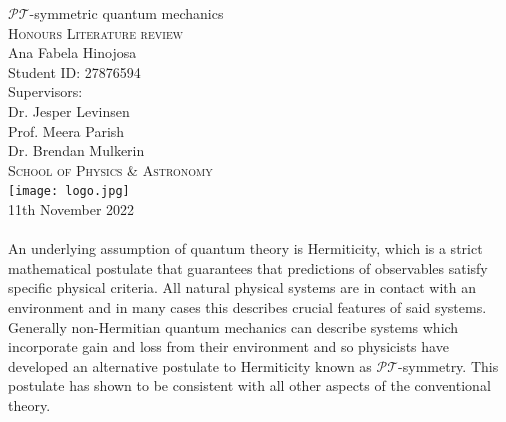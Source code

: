 \documentclass[12pt, a4paper]{report}
\newcommand\PT{\(\mathcal{PT}\)}
\begin{document}
  \begin{center}
  \vspace{2cm}
  {\Huge \( \mathcal{PT} \)-symmetric quantum mechanics}\\
  \vspace{0.5cm}
  \textsc{Honours Literature review}\\
  \vspace{1cm}
  {\Large Ana Fabela Hinojosa\\Student ID: 27876594}\\
  \vspace{0.5cm}
  {\Large Supervisors:\\ Dr. Jesper Levinsen \\ Prof. Meera Parish\\\vspace{0.2cm}Dr. Brendan Mulkerin}\\
  \vspace{0.5cm}
  \textsc{School of Physics \& Astronomy}\\
  \vspace{0.5cm}
  \texttt{[image: logo.jpg]} \\ %
  {11th November 2022}\\
  \vspace{3cm}
 \\An underlying assumption of quantum theory is Hermiticity, which is a strict mathematical postulate that guarantees that predictions of observables satisfy specific physical criteria. All natural physical systems are in contact with an environment and in many cases this describes crucial features of said systems. Generally non-Hermitian quantum mechanics can describe systems which incorporate gain and loss from their environment and so physicists have developed an alternative postulate to Hermiticity known as \PT-symmetry. This postulate has shown to be consistent with all other aspects of the conventional theory.
  \end{center}


\tableofcontents

\end{document}

